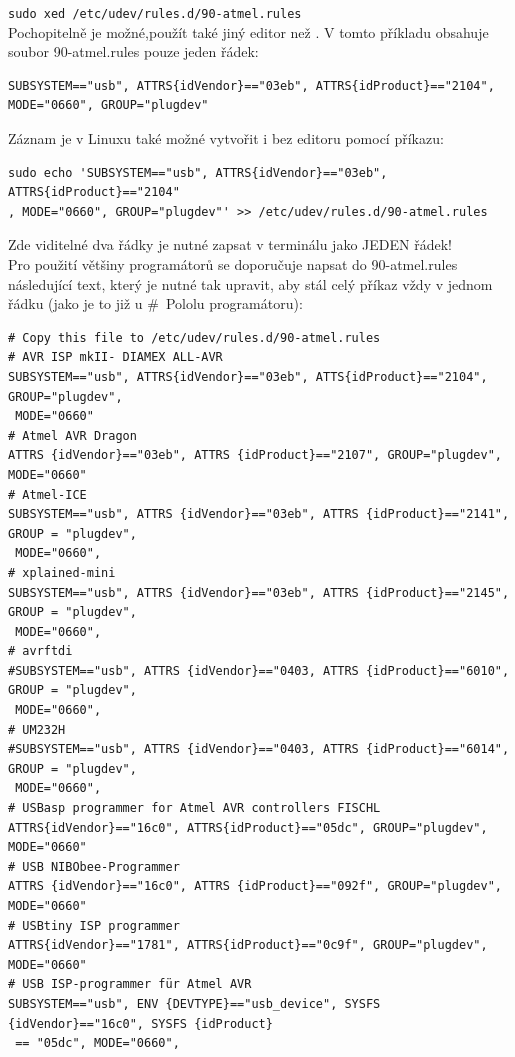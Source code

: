 \verb"sudo xed /etc/udev/rules.d/90-atmel.rules"\\
Pochopitelně je možné,použít také jiný editor než . 
V tomto příkladu obsahuje soubor 90-atmel.rules pouze jeden řádek:
\vspace*{-0.6em}
\begin{footnotesize}\begin{verbatim}
SUBSYSTEM=="usb", ATTRS{idVendor}=="03eb", ATTRS{idProduct}=="2104", MODE="0660", GROUP="plugdev"
\end{verbatim} \end{footnotesize}
\vspace*{-0.6em}
Záznam je v Linuxu také možné vytvořit i bez editoru pomocí příkazu:
\begin{footnotesize} \vspace{-0.4em} \begin{verbatim}
sudo echo 'SUBSYSTEM=="usb", ATTRS{idVendor}=="03eb", ATTRS{idProduct}=="2104"
, MODE="0660", GROUP="plugdev"' >> /etc/udev/rules.d/90-atmel.rules
\end{verbatim} \end{footnotesize}
Zde viditelné dva řádky je nutné zapsat v terminálu jako JEDEN řádek!\\
 Pro použití většiny programátorů se doporučuje napsat do 90-atmel.rules následující text,
který je nutné tak upravit, aby stál celý příkaz vždy v jednom řádku
(jako je to již u \#~Pololu programátoru):
\vspace*{-1em}
\begin{footnotesize} \begin{verbatim}
# Copy this file to /etc/udev/rules.d/90-atmel.rules
# AVR ISP mkII- DIAMEX ALL-AVR
SUBSYSTEM=="usb", ATTRS{idVendor}=="03eb", ATTS{idProduct}=="2104", GROUP="plugdev",
 MODE="0660"
# Atmel AVR Dragon
ATTRS {idVendor}=="03eb", ATTRS {idProduct}=="2107", GROUP="plugdev", MODE="0660"
# Atmel-ICE
SUBSYSTEM=="usb", ATTRS {idVendor}=="03eb", ATTRS {idProduct}=="2141", GROUP = "plugdev",
 MODE="0660",
# xplained-mini
SUBSYSTEM=="usb", ATTRS {idVendor}=="03eb", ATTRS {idProduct}=="2145", GROUP = "plugdev",
 MODE="0660",
# avrftdi
#SUBSYSTEM=="usb", ATTRS {idVendor}=="0403, ATTRS {idProduct}=="6010", GROUP = "plugdev",
 MODE="0660",
# UM232H
#SUBSYSTEM=="usb", ATTRS {idVendor}=="0403, ATTRS {idProduct}=="6014", GROUP = "plugdev",
 MODE="0660",
# USBasp programmer for Atmel AVR controllers FISCHL
ATTRS{idVendor}=="16c0", ATTRS{idProduct}=="05dc", GROUP="plugdev", MODE="0660"
# USB NIBObee-Programmer
ATTRS {idVendor}=="16c0", ATTRS {idProduct}=="092f", GROUP="plugdev", MODE="0660"
# USBtiny ISP programmer
ATTRS{idVendor}=="1781", ATTRS{idProduct}=="0c9f", GROUP="plugdev", MODE="0660"
# USB ISP-programmer für Atmel AVR
SUBSYSTEM=="usb", ENV {DEVTYPE}=="usb_device", SYSFS {idVendor}=="16c0", SYSFS {idProduct}
 == "05dc", MODE="0660",
\end{verbatim} \end{footnotesize}
